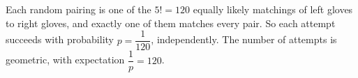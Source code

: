 Each random pairing is one of the $5!=120$ equally likely matchings of left gloves to right gloves, and exactly one of them matches every pair. So each attempt succeeds with probability $p=\dfrac1{120}$, independently. The number of attempts is geometric, with expectation $\dfrac1p=\boxed{120}$.
